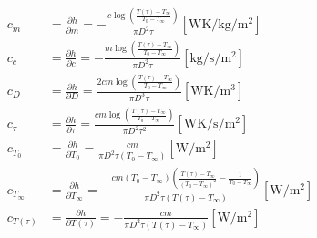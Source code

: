 \begin{align}
c_{m} &= \frac{\partial h}{\partial m} = - \frac{c \log{\left(\frac{T(\tau) - T_{\infty}}{T_{0} - T_{\infty}} \right)}}{\pi D^{2} \tau} \left[\unit{\watt\kelvin\per\kg\per\m\squared}\right]\\
c_{c} &= \frac{\partial h}{\partial c} = - \frac{m \log{\left(\frac{T(\tau) - T_{\infty}}{T_{0} - T_{\infty}} \right)}}{\pi D^{2} \tau} \left[\unit{\kg\per\s\per\m\squared}\right]\\
c_{D} &= \frac{\partial h}{\partial D} = \frac{2 c m \log{\left(\frac{T(\tau) - T_{\infty}}{T_{0} - T_{\infty}} \right)}}{\pi D^{3} \tau} \left[\unit{\watt\kelvin\per\m\cubed}\right]\\
c_{\tau} &= \frac{\partial h}{\partial \tau} = \frac{c m \log{\left(\frac{T(\tau) - T_{\infty}}{T_{0} - T_{\infty}} \right)}}{\pi D^{2} \tau^{2}} \left[\unit{\watt\kelvin\per\s\per\m\squared}\right]\\
c_{T_{0}} &= \frac{\partial h}{\partial T_{0}} = \frac{c m}{\pi D^{2} \tau \left(T_{0} - T_{\infty}\right)} \left[\unit{\watt\per\m\squared}\right]\\
c_{T_{\infty}} &= \frac{\partial h}{\partial T_{\infty}} = - \frac{c m \left(T_{0} - T_{\infty}\right) \left(\frac{T(\tau) - T_{\infty}}{\left(T_{0} - T_{\infty}\right)^{2}} - \frac{1}{T_{0} - T_{\infty}}\right)}{\pi D^{2} \tau \left(T(\tau) - T_{\infty}\right)} \left[\unit{\watt\per\m\squared}\right]\\
c_{T(\tau)} &= \frac{\partial h}{\partial T(\tau)} = - \frac{c m}{\pi D^{2} \tau \left(T(\tau) - T_{\infty}\right)} \left[\unit{\watt\per\m\squared}\right]
\end{align}